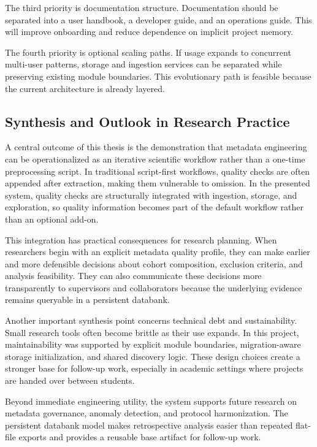 The third priority is documentation structure. Documentation should be separated into a user handbook, a developer guide, and an operations guide. This will improve onboarding and reduce dependence on implicit project memory.

The fourth priority is optional scaling paths. If usage expands to concurrent multi-user patterns, storage and ingestion services can be separated while preserving existing module boundaries. This evolutionary path is feasible because the current architecture is already layered.

\subsection{Synthesis and Outlook in Research Practice}
A central outcome of this thesis is the demonstration that metadata engineering can be operationalized as an iterative scientific workflow rather than a one-time preprocessing script. In traditional script-first workflows, quality checks are often appended after extraction, making them vulnerable to omission. In the presented system, quality checks are structurally integrated with ingestion, storage, and exploration, so quality information becomes part of the default workflow rather than an optional add-on.

This integration has practical consequences for research planning. When researchers begin with an explicit metadata quality profile, they can make earlier and more defensible decisions about cohort composition, exclusion criteria, and analysis feasibility. They can also communicate these decisions more transparently to supervisors and collaborators because the underlying evidence remains queryable in a persistent databank.

Another important synthesis point concerns technical debt and sustainability. Small research tools often become brittle as their use expands. In this project, maintainability was supported by explicit module boundaries, migration-aware storage initialization, and shared discovery logic. These design choices create a stronger base for follow-up work, especially in academic settings where projects are handed over between students.

Beyond immediate engineering utility, the system supports future research on metadata governance, anomaly detection, and protocol harmonization. The persistent databank model makes retrospective analysis easier than repeated flat-file exports and provides a reusable base artifact for follow-up work.

